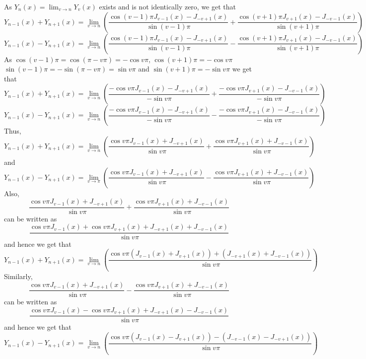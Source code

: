 As $Y_{n}(x)=\lim _{v \rightarrow n} Y_{v}(x)$ exists and is not identically zero, we get that 
$$Y_{n-1}(x)+Y_{n+1}(x)=\lim _{v \rightarrow n}\left(\frac{\cos (v-1) \pi J_{v-1}(x)-J_{-v+1}(x)}{\sin (v-1) \pi}+\frac{\cos (v+1) \pi J_{v+1}(x)-J_{-v-1}(x)}{\sin (v+1) \pi}\right)$$
$$Y_{n-1}(x)-Y_{n+1}(x)=\lim _{v \rightarrow n}\left(\frac{\cos (v-1) \pi J_{v-1}(x)-J_{-v+1}(x)}{\sin (v-1) \pi}-\frac{\cos (v+1) \pi J_{v+1}(x)-J_{-v-1}(x)}{\sin (v+1) \pi}\right)$$
As $\cos (v-1) \pi=\cos (\pi-v \pi)=-\cos v \pi$, $\cos (v+1) \pi=-\cos v \pi$ $\sin (v-1) \pi=-\sin (\pi-v \pi)=\sin v \pi$ and $\sin (v+1) \pi=-\sin v \pi$
we get that
$$Y_{n-1}(x)+Y_{n+1}(x)=\lim _{v \rightarrow n}\left(\frac{-\cos v \pi J_{v-1}(x)-J_{-v+1}(x)}{-\sin v \pi}+\frac{-\cos v \pi J_{v+1}(x)-J_{-v-1}(x)}{-\sin v \pi}\right)$$
$$Y_{n-1}(x)-Y_{n+1}(x)=\lim _{v \rightarrow n}\left(\frac{-\cos v \pi J_{v-1}(x)-J_{-v+1}(x)}{-\sin v \pi}-\frac{-\cos v \pi J_{v+1}(x)-J_{-v-1}(x)}{-\sin v \pi}\right) $$
Thus, 
$$
Y_{n-1}(x)+Y_{n+1}(x)=\lim _{v \rightarrow n}\left(\frac{\cos v \pi J_{v-1}(x)+J_{-v+1}(x)}{\sin v \pi}+\frac{\cos v \pi J_{v+1}(x)+J_{-v-1}(x)}{\sin v \pi}\right)
$$
and
$$
Y_{n-1}(x)-Y_{n+1}(x)=\lim _{v \rightarrow \pi}\left(\frac{\cos v \pi J_{v-1}(x)+J_{-v+1}(x)}{\sin v \pi}-\frac{\cos v \pi J_{v+1}(x)+J_{-v-1}(x)}{\sin v \pi}\right)
$$
Also, 
$$
\frac{\cos v \pi J_{v-1}(x)+J_{-v+1}(x)}{\sin v \pi}+\frac{\cos v \pi J_{v+1}(x)+J_{-v-1}(x)}{\sin v \pi}
$$
can be written as
$$
\frac{\cos v \pi J_{v-1}(x)+\cos v \pi J_{v+1}(x)+J_{-v+1}(x)+J_{-v-1}(x)}{\sin v \pi}
$$
and hence we get that
$$
Y_{n-1}(x)+Y_{n+1}(x)=\lim _{v \rightarrow n}\left(\frac{\cos v \pi\left(J_{v-1}(x)+J_{v+1}(x)\right)+\left(J_{-v+1}(x)+J_{-v-1}(x)\right)}{\sin v \pi}\right)
$$
Similarly, 
$$
\frac{\cos v \pi J_{v-1}(x)+J_{-v+1}(x)}{\sin v \pi}-\frac{\cos v \pi J_{v+1}(x)+J_{-v-1}(x)}{\sin v \pi}
$$
can be written as
$$
\frac{\cos v \pi J_{v-1}(x)-\cos v \pi J_{v+1}(x)+J_{-v+1}(x)-J_{-v-1}(x)}{\sin v \pi}
$$
and hence we get that
$$
Y_{n-1}(x)-Y_{n+1}(x)=\lim _{v \rightarrow n}\left(\frac{\cos v \pi\left(J_{v-1}(x)-J_{v+1}(x)\right)-\left(J_{-v-1}(x)-J_{-v+1}(x)\right)}{\sin v \pi}\right)
$$

